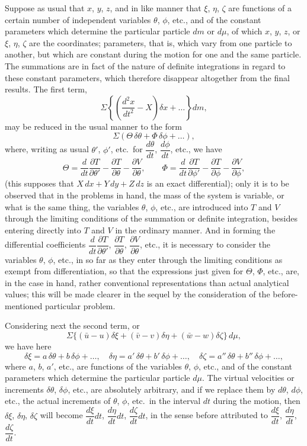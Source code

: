 \documentclass[11pt,a4paper]{book}
\begin{document}
Suppose as usual that $x$, $y$, $z$, and in like manner that $\xi$, $\eta$, $\zeta$ are functions of a certain number of independent variables $\theta$, $\phi$, etc., and of the constant parameters which determine the particular particle $dm$ or $d\mu$, of which $x$, $y$, $z$, or $\xi$, $\eta$, $\zeta$ are the coordinates; parameters, that is, which vary from one particle to another, but which are constant during the motion for one and the same particle. The summations are in fact of the nature of definite integrations in regard to these constant parameters, which therefore disappear altogether from the final results. The first term,
\[
\Sigma\left\{\left(\frac{d^2x}{dt^2}-X\right)\delta x+\ldots\right\}dm,
\]
may be reduced in the usual manner to the form
\[
\Sigma(\Theta\,\delta\theta+\Phi\,\delta\phi+\ldots),
\]
where, writing as usual $\theta'$, $\phi'$, etc.\ for $\dfrac{d\theta}{dt}$, $\dfrac{d\phi}{dt}$, etc., we have
\[
\Theta=\frac{d}{dt}\frac{\partial T}{\partial\theta'}-\frac{\partial T}{\partial\theta}-\frac{\partial V}{\partial\theta},
\qquad
\Phi=\frac{d}{dt}\frac{\partial T}{\partial\phi'}-\frac{\partial T}{\partial\phi}-\frac{\partial V}{\partial\phi},
\]
(this supposes that $X\,dx+Y\,dy+Z\,dz$ is an exact differential); only it is to be observed that in the problems in hand, the mass of the system is variable, or what is the same thing, the variables $\theta$, $\phi$, etc., are introduced into $T$ and $V$ through the limiting conditions of the summation or definite integration, besides entering directly into $T$ and $V$ in the ordinary manner. And in forming the differential coefficients $\dfrac{d}{dt}\dfrac{\partial T}{\partial\theta'}$, $\dfrac{\partial T}{\partial\theta}$, $\dfrac{\partial V}{\partial\theta}$, etc., it is necessary to consider the variables $\theta$, $\phi$, etc., in so far as they enter through the limiting conditions as exempt from differentiation, so that the expressions just given for $\Theta$, $\Phi$, etc., are, in the case in hand, rather conventional representations than actual analytical values; this will be made clearer in the sequel by the consideration of the before-mentioned particular problem.

Considering next the second term, or
\[
\Sigma\{(\bar{u}-u)\delta\xi+(\bar{v}-v)\delta\eta+(\bar{w}-w)\delta\zeta\}\,d\mu,
\]
we have here
\[
\delta\xi=a\,\delta\theta+b\,\delta\phi+\ldots,
\quad
\delta\eta=a'\,\delta\theta+b'\,\delta\phi+\ldots,
\quad
\delta\zeta=a''\,\delta\theta+b''\,\delta\phi+\ldots,
\]
where $a$, $b$, $a'$, etc., are functions of the variables $\theta$, $\phi$, etc., and of the constant parameters which determine the particular particle $d\mu$. The virtual velocities or increments $\delta\theta$, $\delta\phi$, etc., are absolutely arbitrary, and if we replace them by $d\theta$, $d\phi$, etc., the actual increments of $\theta$, $\phi$, etc.\ in the interval $dt$ during the motion, then $\delta\xi$, $\delta\eta$, $\delta\zeta$ will become $\dfrac{d\xi}{dt}dt$, $\dfrac{d\eta}{dt}dt$, $\dfrac{d\zeta}{dt}dt$, in the sense before attributed to $\dfrac{d\xi}{dt}$, $\dfrac{d\eta}{dt}$, $\dfrac{d\zeta}{dt}$.
\end{document}
